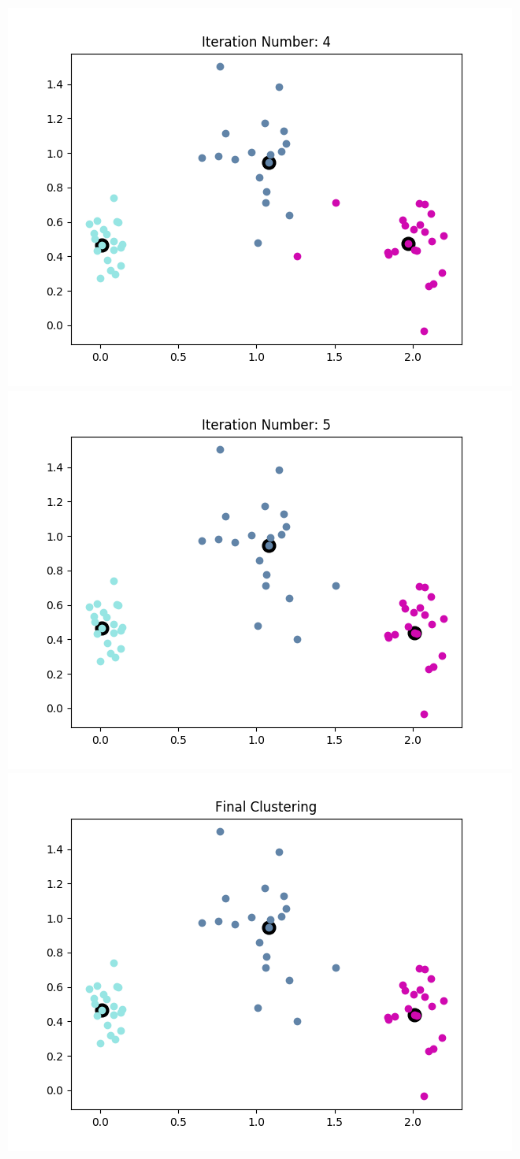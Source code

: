 \documentclass[11pt]{article}
\begin{document}
\begin{enumerate}
\includegraphics[scale=0.4]{medoid_4.png} \newline
\includegraphics[scale=0.4]{medoid_5.png}
\includegraphics[scale=0.4]{medoid_final.png} \newline

\end{enumerate}
\end{document}

